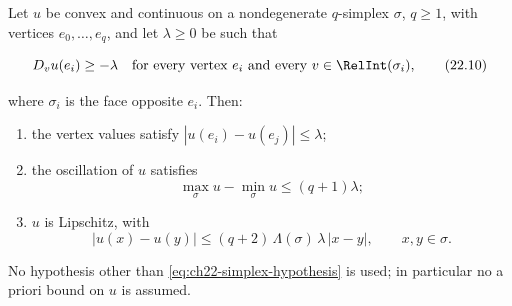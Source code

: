 \begin{lemma}
\label{lem:ch22-simplex}
Let $u$ be convex and continuous on a nondegenerate $q$-simplex
$\sigma$, $q\geq1$, with vertices $e_0,\ldots,e_q$, and let
$\lambda\geq0$ be
such that

\[
 D_vu(e_i)\geq-\lambda
 \quad\text{for every vertex }e_i\text{ and every }
 v\in\RelInt(\sigma_i),
\tag{22.10}\label{eq:ch22-simplex-hypothesis}
\]

where $\sigma_i$ is the face opposite $e_i$.  Then:
\begin{enumerate}
\item\label{itm:ch22-simplex:vertices} the vertex values satisfy
$|u(e_i)-u(e_j)|\leq\lambda$;
\item\label{itm:ch22-simplex:osc} the oscillation of $u$ satisfies
\[
 \max_\sigma u-\min_\sigma u\leq(q+1)\lambda;
\tag{22.11}\label{eq:ch22-simplex-oscillation}
\]
\item\label{itm:ch22-simplex:lip} $u$ is Lipschitz, with
\[
 |u(x)-u(y)|\leq(q+2)\,\Lambda(\sigma)\,\lambda\,|x-y|,
 \qquad x,y\in\sigma .
\tag{22.12}\label{eq:ch22-simplex-lipschitz}
\]
\end{enumerate}
No hypothesis other than \eqref{eq:ch22-simplex-hypothesis} is used; in
particular no a priori bound on $u$ is assumed.
\end{lemma}

